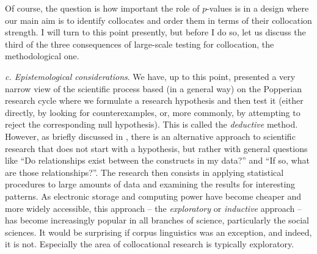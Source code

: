 Of course, the question is how important the role of $p$-values is in a design  where our main aim is to identify collocates  and order them in terms of their collocation strength. I will turn to this point presently, but before I do so, let us discuss the third of the three consequences of large\hyp{}scale testing for collocation, the methodological one.

\textit{c. Epistemological considerations}.  We have, up to this point, presented a very narrow view of the scientific process based (in a general way) on the Popperian research cycle where we formulate a research hypothesis and then test it (either directly, by looking for counterexamples,  or, more commonly, by attempting to reject the corresponding null hypothesis).  This is called the \textit{deductive}  method. However, as briefly discussed in , there is an alternative approach to scientific research that does not start with a hypothesis, but rather with general questions like ``Do relationships exist between the constructs in my data?'' and ``If so, what are those relationships?''. The research then consists in applying statistical procedures to large amounts of data and examining the results for interesting patterns. As electronic storage and computing power have become cheaper and more widely accessible, this approach -- the \textit{exploratory}  or \textit{inductive}  approach -- has become increasingly popular in all branches of science, particularly the social sciences. It would be surprising if corpus linguistics was an exception, and indeed, it is not. Especially the area of collocational  research is typically  exploratory.

